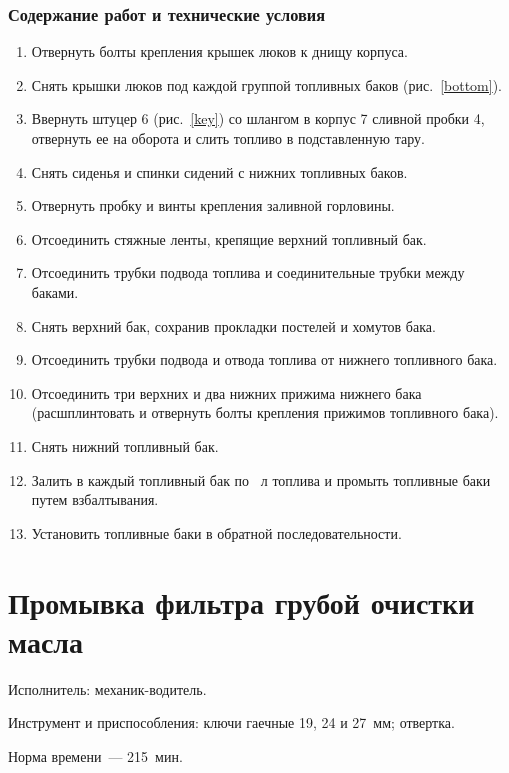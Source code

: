 \subsubsection{Содержание работ и технические условия}
\begin{enumerate}
    \item Отвернуть болты крепления крышек люков к днищу корпуса. 
    \item Снять крышки люков под каждой группой топливных баков (рис.~\ref{bottom}). 
    \item Ввернуть штуцер 6 (рис.~\ref{key}) со шлангом в корпус 7 сливной пробки 4, отвернуть ее на  оборота и слить топливо в подставленную тару. 
    \item Снять сиденья и спинки сидений с нижних топливных баков. 
    \item Отвернуть пробку и винты крепления заливной горловины. 
    \item Отсоединить стяжные ленты, крепящие верхний топливный бак. 
    \item Отсоединить трубки подвода топлива и соединительные трубки между баками. 
    \item Снять верхний бак, сохранив прокладки постелей и хомутов бака. 
    \item Отсоединить трубки подвода и отвода топлива от нижнего топливного бака. 
    \item Отсоединить три верхних и два нижних прижима нижнего бака (расшплинтовать и отвернуть болты крепления прижимов топливного бака). 
    \item Снять нижний топливный бак. 
    \item Залить в каждый топливный бак по ~л топлива и промыть топливные баки путем взбалтывания. 
    \item Установить топливные баки в обратной последовательности.
\end{enumerate}

\section{Промывка фильтра грубой очистки масла}
Исполнитель: механик-водитель.

Инструмент и приспособления: ключи гаечные 19, 24 и 27~мм; отвертка. 

Норма времени~--- 215~мин. 

